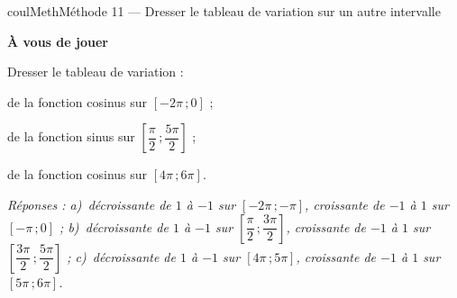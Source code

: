 \documentclass[11pt,a4paper]{article}
\makeatletter
\newcommand{\lycee@intff}[2]{\left[#1\,;#2\right]}
\providecommand{\intff}{\lycee@intff}%
\newcounter{lycee@signet}
\newcommand{\signet}[3][]{\stepcounter{lycee@signet}%
  \edef\lycee@dest{\if\relax\detokenize{#1}\relax
    signet.\arabic{lycee@signet}\else#1\fi}%
  \hypertarget{\lycee@dest}{}\bookmark[level=#2,dest=\lycee@dest]{#3}}
\newcounter{methode}
\newenvironment{methodebox}[1][Méthode]{\stepcounter{methode}%
  \begin{boitecours}[phantom={\signet[methode-\arabic{methode}]{2}{#1}}]{coulMeth}{#1}}%
  {\end{boitecours}}
\newcommand{\etape}[1]{\par\smallskip\textbf{\color{coulMeth}#1}\par\nobreak\smallskip}
\newcommand{\reponse}[1]{\par\smallskip
  {\footnotesize\itshape\color{black!55}Réponses : #1}}
\makeatother
\begin{document}
\begin{methodebox}[Méthode 11 --- Dresser le tableau de variation sur un autre intervalle]
\etape{À vous de jouer}
Dresser le tableau de variation :
\begin{questions}[label=\alph*)]
  \item de la fonction cosinus sur $\intff{-2\pi}{0}$ ;
  \item de la fonction sinus sur $\intff{\dfrac{\pi}{2}}{\dfrac{5\pi}{2}}$ ;
  \item de la fonction cosinus sur $\intff{4\pi}{6\pi}$.
\end{questions}
\reponse{a)~décroissante de $1$ à $-1$ sur $\intff{-2\pi}{-\pi}$, croissante de $-1$ à $1$ sur $\intff{-\pi}{0}$ ;\;
b)~décroissante de $1$ à $-1$ sur $\intff{\dfrac{\pi}{2}}{\dfrac{3\pi}{2}}$, croissante de $-1$ à $1$ sur $\intff{\dfrac{3\pi}{2}}{\dfrac{5\pi}{2}}$ ;\;
c)~décroissante de $1$ à $-1$ sur $\intff{4\pi}{5\pi}$, croissante de $-1$ à $1$ sur $\intff{5\pi}{6\pi}$.}
\end{methodebox}
\end{document}
